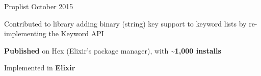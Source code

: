\begin{cventries}

    \cventry
    {Proplist} %
    {} %
    {}{October 2015}{
        \begin{cvitems} %
            \item {Contributed to library adding binary (string) key support to keyword lists by re-implementing the Keyword API}
            \item {\textbf{Published} on Hex (Elixir's package manager), with \textbf{\textasciitilde1,000 installs}}
            \item {Implemented in \textbf{Elixir}}
        \end{cvitems}
    }

\end{cventries}
